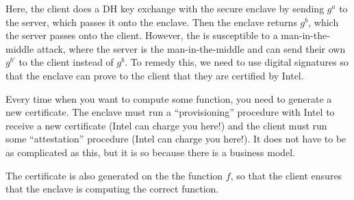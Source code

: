 
Here, the client does a DH key exchange with the secure enclave by sending $g^a$ to the server, which passes it onto the enclave. Then the enclave returns $g^b$, which the server passes onto the client. However, the is susceptible to a man-in-the-middle attack, where the server is the man-in-the-middle and can send their own $g^{b'}$ to the client instead of $g^b$. To remedy this, we need to use digital signatures so that the enclave can prove to the client that they are certified by Intel.

Every time when you want to compute some function, you need to generate a new certificate. The enclave must run a ``provisioning'' procedure with Intel to receive a new certificate (Intel can charge you here!) and the client must run some ``attestation'' procedure (Intel can charge you here!). It does not have to be as complicated as this, but it is so because there is a business model.

The certificate is also generated on the the function $f$, so that the client ensures that the enclave is computing the correct function.

